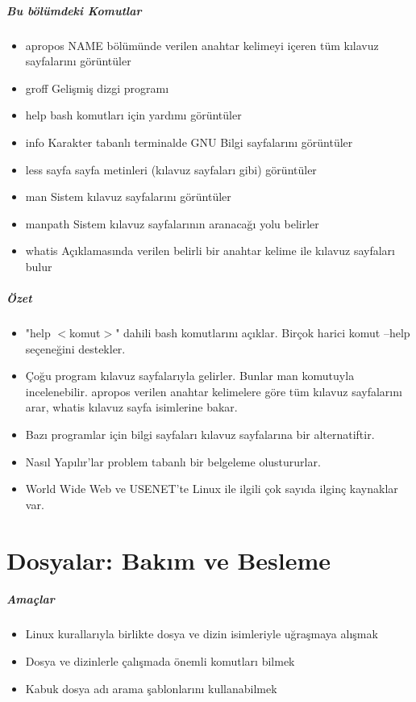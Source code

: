\documentclass[10pt,a5paper]{book}
\begin{document}
\paragraph{Bu bölümdeki Komutlar}{
\begin{itemize}
\item apropos 	NAME bölümünde verilen anahtar kelimeyi içeren tüm kılavuz sayfalarını görüntüler
\item groff		Gelişmiş dizgi programı
\item help 		bash komutları için yardımı görüntüler
\item info 		Karakter tabanlı terminalde GNU Bilgi sayfalarını görüntüler
\item less		sayfa sayfa metinleri (kılavuz sayfaları gibi) görüntüler
\item man		Sistem kılavuz sayfalarını görüntüler
\item manpath		Sistem kılavuz sayfalarının aranacağı yolu belirler
\item whatis		Açıklamasında verilen belirli bir anahtar kelime ile kılavuz sayfaları bulur
\end{itemize}}
\paragraph{Özet}{
\begin{itemize}
\item "help $<$komut$>$" dahili bash komutlarını açıklar. Birçok harici komut --help seçeneğini destekler.
\item Çoğu program kılavuz sayfalarıyla gelirler. Bunlar man komutuyla incelenebilir. apropos verilen anahtar kelimelere göre tüm kılavuz sayfalarını arar, whatis kılavuz sayfa isimlerine bakar.
\item Bazı programlar için bilgi sayfaları kılavuz sayfalarına bir alternatiftir.
\item Nasıl Yapılır'lar problem tabanlı bir belgeleme olustururlar.
\item World Wide Web ve USENET'te Linux ile ilgili çok sayıda ilginç kaynaklar var.
\end{itemize}}

\chapter{Dosyalar: Bakım ve Besleme}
\paragraph{Amaçlar}
\begin{itemize}
 \item Linux kurallarıyla birlikte dosya ve dizin isimleriyle uğraşmaya alışmak
 \item Dosya ve dizinlerle çalışmada önemli komutları bilmek
 \item Kabuk dosya adı arama şablonlarını kullanabilmek
 \end{itemize}
 
\end{document}
